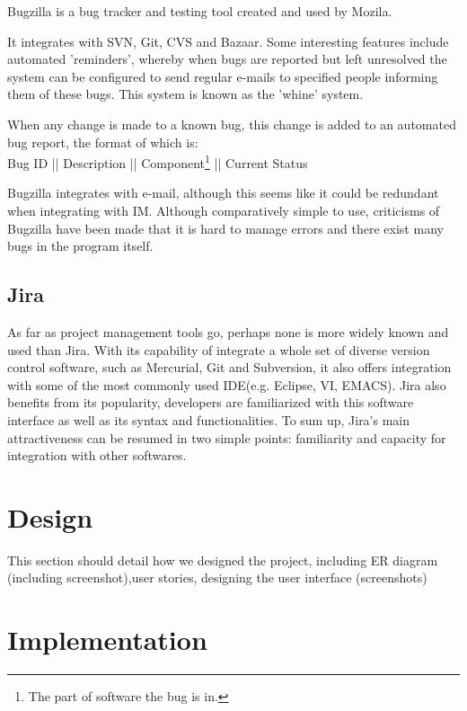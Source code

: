 \documentclass[a4paper]{l3proj}
\begin{document}
Bugzilla is a bug tracker and testing tool created and used by Mozila.

It integrates with SVN, Git, CVS and Bazaar.  Some interesting
features include automated 'reminders', whereby when bugs are
reported but left unresolved the system can be configured to send
regular e-mails to specified people informing them of these bugs.
This system is known as the 'whine' system.  

When any change is made to a known bug, this change is added to an
automated bug report, the format of which is:\\
Bug ID || Description || Component\footnote{The part of software the
  bug is in.} || Current Status

Bugzilla integrates with e-mail, although this seems like it could be
redundant when integrating with IM.  
Although comparatively simple to use, criticisms of Bugzilla have been
made that it is hard to manage errors and there exist many bugs in the
program itself.  


\section{Jira}
\label{jira}

As far as project management tools go, perhaps none is more widely known and used than Jira. With its capability of integrate a whole set of diverse version control software, such as Mercurial, Git and Subversion, it also offers integration with some of the most commonly used IDE(e.g. Eclipse, VI, EMACS). Jira also benefits from its popularity, developers are familiarized with this software interface as well as its syntax and functionalities. To sum up, Jira’s main attractiveness can be resumed in two simple points: familiarity and capacity for integration with other softwares.


\chapter{Design}
\label{design}

This section should detail how we designed the project, including ER diagram (including screenshot),user stories, designing the user interface (screenshots)

\chapter{Implementation}
\label{impl}
\end{document}
